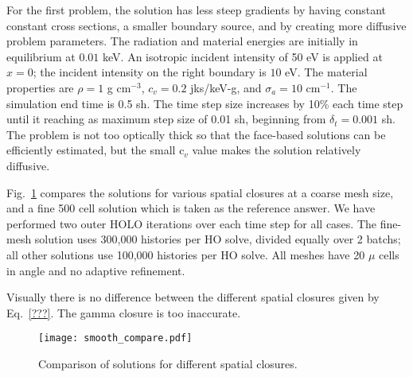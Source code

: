 For the first problem, the solution has less steep gradients by having constant constant cross
sections, a smaller boundary source, and by creating more diffusive problem parameters.
The radiation and material energies are initially in
equilibrium at $0.01$ keV.   An isotropic incident intensity of 50 eV is applied
at $x=0$; the incident intensity on the right boundary is $10$ eV.
The material properties are $\rho = 1$ g cm$^{-3}$, $c_v = 0.2$ jks/keV-g, and
$\sigma_a=10$ cm$^{-1}$.
The simulation end time is 0.5 sh.  The time step size increases by 10\% each time step
until it reaching as maximum step size of 0.01 sh, beginning from $\delta_t = 0.001$ sh.
The problem is not too optically thick so that the face-based solutions can be efficiently
estimated, but the small c$_v$ value makes the solution relatively diffusive.  

Fig.~\ref{fig:smooth_compare} compares the solutions for various spatial closures at a
coarse mesh size, and a fine 500 cell solution which is taken as the reference answer. We
have performed two outer HOLO iterations over each time step for all cases.   The
fine-mesh solution uses 300,000 histories per HO solve, divided equally over 2 batchs; all
other solutions use 100,000 histories per HO solve.  All meshes have 20 $\mu$
cells in angle and no adaptive refinement.

Visually there
is no difference between the different spatial closures given by Eq.~\eqref{???}. The
gamma closure is too inaccurate.

\begin{figure}[H]
    \centering
    \texttt{[image: smooth\_compare.pdf]}
    \caption{\label{fig:smooth_compare} Comparison of solutions for different spatial closures.}
\end{figure}





